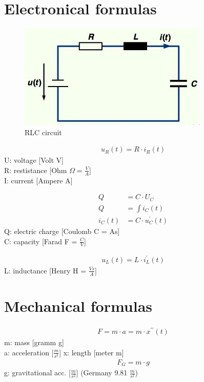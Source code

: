 \section{Electronical formulas}
	

\begin{figure}[!h]
\centering
\includegraphics[width=0.7\linewidth]{images_Form/RLC}
\caption{RLC circuit}
\label{fig:RLC}
\end{figure}

\begin{align}
	u_R(t) = R \cdot i_R(t)
\end{align}
U: voltage [Volt V] \\
R: restistance [Ohm $\varOmega = \frac{V}{A}$] \\
I: current [Ampere A]

\begin{align}
	Q &= C \cdot U_C \\
	Q &= \int i_C(t) \\
	i_C(t) &= C \cdot u_C^\prime(t)
\end{align}
Q: electric charge [Coulomb C = As] \\
C: capacity [Farad F = $\frac{C}{V}$]

\begin{align}
	u_L(t) = L \cdot i_L^\prime(t)
\end{align}
L: inductance [Henry H = $\frac{Vs}{A}$]

\newpage
\section{Mechanical formulas}

\begin{align}
F = m \cdot a = m \cdot x^{\prime\prime}(t)
\end{align}
m: mass [gramm g] \\
a: acceleration [$\frac{m}{s^2}$]
x: length [meter m]
\begin{align}
F_G = m \cdot g 
\end{align}
g: gravitational acc. [$\frac{m}{s^2}$] (Germany 9.81 $\frac{m}{s^2}$)

